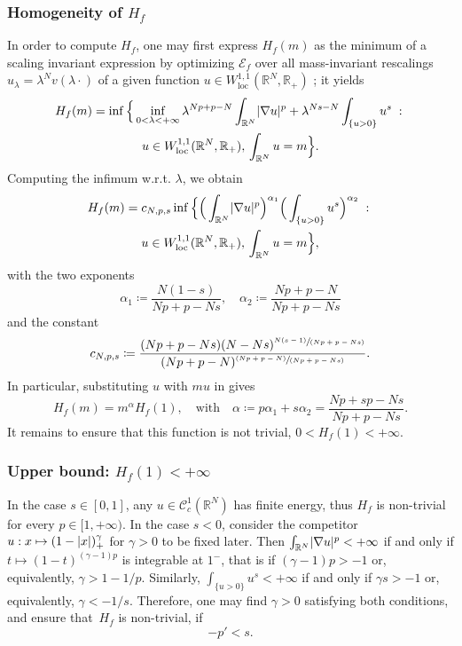 \documentclass[JEP,XML,SOM,Unicode,published]{cedram}
\newcommand{\spfrac}[2]{{\sfrac{#1}{(#2)}}}
\newcommand{\pspfrac}[2]{{\sfrac{(#1)}{(#2)}}}
\theoremstyle{plain}
\theoremstyle{definition}
\newcommand{\R}{\mathbb{R}}
\newcommand{\Cspace}{\mathscr{C}}
\newcommand{\ener}{\mathcal{E}}
\newcommand{\loc}{\mathrm{loc}}
\newcommand{\st}{\;:\;}
\DeclarePairedDelimiter{\abs}{\lvert}{\rvert}
\begin{document}
\subsubsection*{Homogeneity of $H_f$}
In order to compute $H_f$, one may first express $H_f(m)$ as the minimum of a scaling invariant expression by optimizing $\ener_f$ over all mass-invariant rescalings $u_\lambda = \lambda^N v(\lambda \cdot)$ of a given function $u\in W^{1,1}_{\loc}(\R^N,\R_+)$ ; it yields\vspace*{-3pt}
\begin{multline}\label{rescalingCost}
H_f(m)=\inf\Big\{\inf_{0<\lambda<+\infty}\lambda^{Np+p-N}\int_{\R^N}\abs{\nabla u}^p +\lambda^{Ns-N}\int_{\{u>0\}}u^s\st\\ u\in W^{1,1}_{\loc}(\R^N,\R_+),\,\int_{\R^N}u=m\Big\}.
\end{multline}
Computing the infimum w.r.t. $\lambda$, we obtain\vspace*{-3pt}
\begin{multline}\label{scaleInvariantCost}
H_f(m)=c_{N,p,s}\inf\Big\{\Big(\int_{\R^N}\abs{\nabla u}^p\Big)^{\alpha_1}\Big(\int_{\{u>0\}}u^s\Big)^{\alpha_2}\st \\u\in W^{1,1}_{\loc}(\R^N,\R_+),\,\int_{\R^N}u=m\Big\},
\end{multline}
with the two exponents\vspace*{-3pt}
\[
\alpha_1\coloneqq \frac{N(1-s)}{Np+p-Ns},\quad
\alpha_2\coloneqq \frac{Np+p-N}{Np+p-Ns}
\]
and the constant\vspace*{-3pt}
\[
c_{N,p,s} \coloneqq \frac{(Np+p-Ns)(N-Ns)^{\spfrac{N(s-1)}{Np+p-Ns}}}{(Np+p-N)^{\pspfrac{Np+p-N}{Np+p-Ns}}}.
\]
In particular, substituting $u$ with $mu$ in  gives\vspace*{-3pt}
\begin{equation}
\label{alphaCost}
H_f(m)=m^\alpha H_f(1),\quad\text{with} \quad\alpha\coloneqq p\alpha_1+s\alpha_2=\frac{Np+sp-Ns}{Np+p-Ns}.
\end{equation}
It remains to ensure that this function is not trivial, \ie $0<H_f(1)<+\infty$.

\subsubsection*{Upper bound: $H_f(1)<+\infty$}
In the case $s\in [0,1]$, any $u\in\Cspace_c^1(\R^N)$ has finite energy, thus $H_f$ is non-trivial for every $p\in [1,+\infty)$. In the case $s< 0$, consider the competitor $u :x \mapsto (1-\abs{x})_+^\gamma$ for $\gamma > 0$ to be fixed later. Then $\int_{\R^N} \abs{\nabla u}^p < +\infty$ if and only if $t \mapsto (1-t)^{(\gamma-1)p}$ is integrable at $1^-$, that is if $(\gamma-1)p > -1$ or, equivalently, $ \gamma > 1- 1/p$. Similarly, $\int_{\{u>0\}} u^s < +\infty$ if and only if $\gamma s > -1$ or, equivalently, $\gamma < -1/s$. Therefore, one may find $\gamma > 0$ satisfying both conditions, and ensure that~$H_{f}$ is non-trivial, if
\[-p'<s.\]
\end{document}
